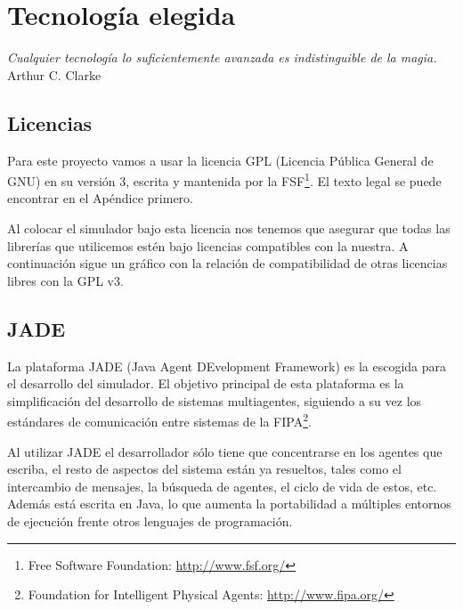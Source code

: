 
\chapter*{Tecnología elegida} \label{cap4}


\begin{flushright}
\begin{minipage}{7.85cm}
    {\em Cualquier tecnología lo suficientemente avanzada es indistinguible de
    la magia.} \\ Arthur C. Clarke
\end{minipage}
\end{flushright}

\vspace*{5mm}

\section*{Licencias}

Para este proyecto vamos a usar la licencia GPL (Licencia Pública General de
GNU) en su versión 3, escrita y mantenida por la FSF\footnote{Free Software
Foundation: \url{http://www.fsf.org/}}. El texto legal se puede encontrar en el
Apéndice primero. %

Al colocar el simulador bajo esta licencia nos tenemos que asegurar que todas
las librerías que utilicemos estén bajo licencias compatibles con la nuestra. A
continuación sigue un gráfico con la relación de compatibilidad de otras
licencias libres con la GPL v3.


\section*{JADE}

La plataforma JADE (Java Agent DEvelopment Framework) es la escogida para el
desarrollo del simulador. El objetivo principal de esta plataforma es la
simplificación del desarrollo de sistemas multiagentes, siguiendo a su vez los
estándares de comunicación entre sistemas de la FIPA\footnote{Foundation for
Intelligent Physical Agents: \url{http://www.fipa.org/}}.

Al utilizar JADE el desarrollador sólo tiene que concentrarse en los agentes
que escriba, el resto de aspectos del sistema están ya resueltos, tales como el
intercambio de mensajes, la búsqueda de agentes, el ciclo de vida de estos,
etc. Además está escrita en Java, lo que aumenta la portabilidad a múltiples
entornos de ejecución frente otros lenguajes de programación.

